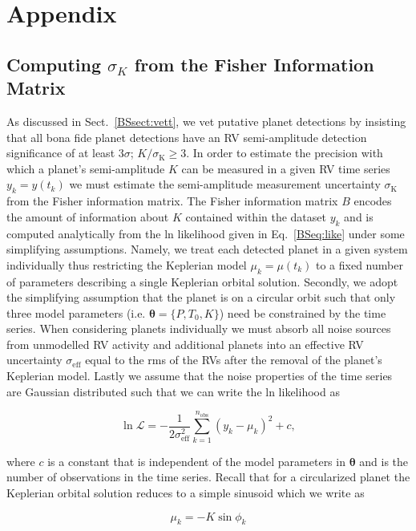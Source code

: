 \section{Appendix}
\subsection{Computing $\sigma_K$ from the Fisher Information Matrix} \label{app:fisher}
As discussed in Sect.~\ref{BSsect:vett}, we vet putative planet detections by insisting that
all bona fide planet detections have an RV semi-amplitude detection significance of at least
$3\sigma$; $K/\sigma_{\text{K}} \geq 3$. 
In order to estimate the precision with which a planet's semi-amplitude $K$ can be measured 
in a given RV time series $y_k=y(t_k)$ we must estimate the semi-amplitude measurement
uncertainty $\sigma_{\text{K}}$ from the Fisher information matrix. The Fisher information matrix $B$
encodes the amount of information about $K$ contained within the dataset $y_k$ and is computed
analytically
from the ln likelihood given in Eq.~\ref{BSeq:like} under some simplifying assumptions. Namely,
we treat each detected planet in a given system individually thus restricting the Keplerian
model $\mu_k=\mu(t_k)$ to a fixed number of parameters describing a single Keplerian orbital
solution. Secondly, we adopt the simplifying assumption that the planet is on a circular
orbit such that only three model parameters (i.e. $\boldsymbol{\theta}=\{P,T_0,K\}$) need be
constrained by the time series. When considering planets individually we
must absorb all noise sources from unmodelled RV activity and additional planets
into an effective RV uncertainty $\sigma_{\text{eff}}$ equal to the rms of the RVs after the
removal of the planet's Keplerian model. Lastly we assume that the noise properties of the
time series are Gaussian distributed such that we can write the ln likelihood as

\begin{equation}
  \ln{\mathcal{L}} = -\frac{1}{2\sigma_{\text{eff}}^2} \sum_{k=1}^{n_{\text{obs}}} (y_k - \mu_k)^2 + c, \label{BSeq:ll2}
\end{equation}

\noindent where $c$ is a constant that is independent of the model parameters in $\boldsymbol{\theta}$
and \nobs{} is the number of observations in the time series.
Recall that for a circularized planet the Keplerian orbital solution reduces to a simple sinusoid which
we write as

\begin{equation}
  \mu_k = -K \sin{\phi_k} \label{BSeq:kep}
\end{equation}

